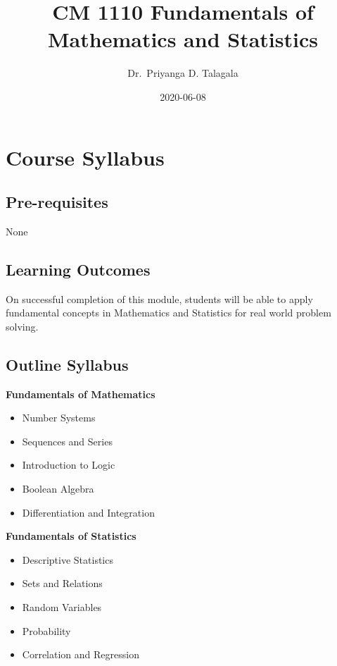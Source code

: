 \documentclass[]{book}
\title{CM 1110 Fundamentals of Mathematics and Statistics}
\author{Dr.~Priyanga D. Talagala}
\date{2020-06-08}
\providecommand{\tightlist}{%
  \setlength{\itemsep}{0pt}\setlength{\parskip}{0pt}}
\begin{document}
\maketitle

{
\setcounter{tocdepth}{1}
\tableofcontents
}
\hypertarget{course-syllabus}{%
\chapter*{Course Syllabus}\label{course-syllabus}}

\hypertarget{pre-requisites}{%
\section*{Pre-requisites}\label{pre-requisites}}

None

\hypertarget{learning-outcomes}{%
\section*{Learning Outcomes}\label{learning-outcomes}}

On successful completion of this module, students will be able to apply fundamental concepts in Mathematics and Statistics for real world problem solving.

\hypertarget{outline-syllabus}{%
\section*{Outline Syllabus}\label{outline-syllabus}}

\textbf{Fundamentals of Mathematics}

\begin{itemize}
\tightlist
\item
  Number Systems
\item
  Sequences and Series
\item
  Introduction to Logic
\item
  Boolean Algebra
\item
  Differentiation and Integration
\end{itemize}

\textbf{Fundamentals of Statistics}

\begin{itemize}
\tightlist
\item
  Descriptive Statistics
\item
  Sets and Relations
\item
  Random Variables
\item
  Probability
\item
  Correlation and Regression
\end{itemize}
\end{document}
